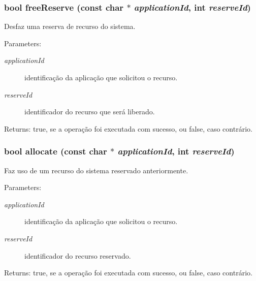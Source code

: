 \subsubsection{\setlength{\rightskip}{0pt plus 5cm}bool freeReserve (const char $\ast$ {\em applicationId}, int {\em reserveId})}\label{classbr_1_1ufscar_1_1lince_1_1ginga_1_1recommender_1_1SystemResource_daffced4501a80d539f9ae02918b9a17}


Desfaz uma reserva de recurso do sistema. \begin{Desc}
\item[Parameters:]
\begin{description}
\item[{\em applicationId}]identificação da aplicação que solicitou o recurso. \item[{\em reserveId}]identificador do recurso que será liberado. \end{description}
\end{Desc}
\begin{Desc}
\item[Returns:]true, se a operação foi executada com sucesso, ou false, caso contrário. \end{Desc}
\subsubsection{\setlength{\rightskip}{0pt plus 5cm}bool allocate (const char $\ast$ {\em applicationId}, int {\em reserveId})}\label{classbr_1_1ufscar_1_1lince_1_1ginga_1_1recommender_1_1SystemResource_e51ad60fe4eecf555a5c528bada11183}


Faz uso de um recurso do sistema reservado anteriormente. \begin{Desc}
\item[Parameters:]
\begin{description}
\item[{\em applicationId}]identificação da aplicação que solicitou o recurso. \item[{\em reserveId}]identificador do recurso reservado. \end{description}
\end{Desc}
\begin{Desc}
\item[Returns:]true, se a operação foi executada com sucesso, ou false, caso contrário. \end{Desc}
